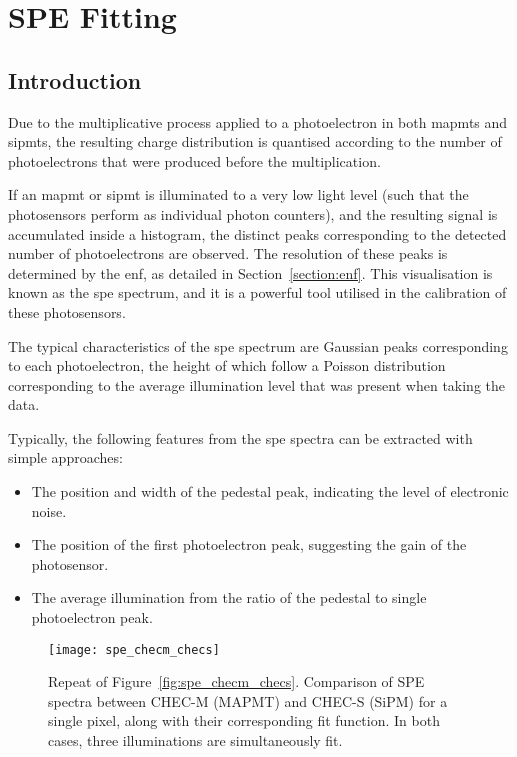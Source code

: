 \chapter{\label{a3-spe}SPE Fitting}

\minitoc

\section{Introduction}

Due to the multiplicative process applied to a photoelectron in both \glspl{mapmt} and \glspl{sipmt}, the resulting charge distribution is quantised according to the number of photoelectrons that were produced before the multiplication. 

If an \gls{mapmt} or \gls{sipmt} is illuminated to a very low light level (such that the photosensors perform as individual photon counters), and the resulting signal is accumulated inside a histogram, the distinct peaks corresponding to the detected number of photoelectrons are observed. The resolution of these peaks is determined by the \gls{enf}, as detailed in Section~\ref{section:enf}. This visualisation is known as the \gls{spe} spectrum, and it is a powerful tool utilised in the calibration of these photosensors.

The typical characteristics of the \gls{spe} spectrum are Gaussian peaks corresponding to each photoelectron, the height of which follow a Poisson distribution corresponding to the average illumination level that was present when taking the data.

Typically, the following features from the \gls{spe} spectra can be extracted with simple approaches:
\begin{itemize}
\item The position and width of the pedestal peak, indicating the level of electronic noise.
\item The position of the first photoelectron peak, suggesting the gain of the photosensor.
\item The average illumination from the ratio of the pedestal to single photoelectron peak.
\end{itemize}

\begin{figure}
	\centering
    \texttt{[image: spe\_checm\_checs]} 
	\caption[(Repeated) Comparison of SPE spectra between CHEC-M and CHEC-S.]{Repeat of Figure~\ref{fig:spe_checm_checs}. Comparison of SPE spectra between CHEC-M (MAPMT) and CHEC-S (SiPM) for a single pixel, along with their corresponding fit function. In both cases, three illuminations are simultaneously fit.} 
	\label{fig:spe_checm_checs_repeat}
\end{figure}

